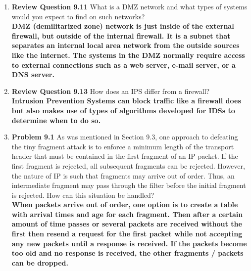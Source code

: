 \documentclass[12pt]{article}
\begin{document}
\renewcommand{\headrulewidth}{0.4pt}
\vspace{-3mm}
\begin{enumerate}
  \item \textbf{Review Question 9.11} What is a DMZ network and what types of systems would you expect to find on such networks? \\

  \textbf{DMZ (demilitarized zone) network is just inside of the external firewall, but outside of the internal firewall. It is a subnet that separates an internal local area network from the outside sources like the internet. The systems in the DMZ normally require access to external connections such as a web server, e-mail server, or a DNS server.} \\

  \item \textbf{Review Question 9.13} How does an IPS differ from a firewall? \\

  \textbf{Intrusion Prevention Systems can block traffic like a firewall does but also makes use of types of algorithms developed for IDSs to determine when to do so.} \\

  \item \textbf{Problem 9.1} As was mentioned in Section 9.3, one approach to defeating the tiny fragment attack is to enforce a minimum length of the transport header that must be contained in the first fragment of an IP packet. If the first fragment is rejected, all subsequent fragments can be rejected. However, the nature of IP is such that fragments may arrive out of order. Thus, an intermediate fragment may pass through the filter before the initial fragment is rejected. How can this situation be handled? \\

  \textbf{When packets arrive out of order, one option is to create a table with arrival times and age for each fragment. Then after a certain amount of time passes or several packets are received without the first then resend a request for the first packet while not accepting any new packets until a response is received. If the packets become too old and no response is received, the other fragments / packets can be dropped.} \\


\end{enumerate}
\end{document}
